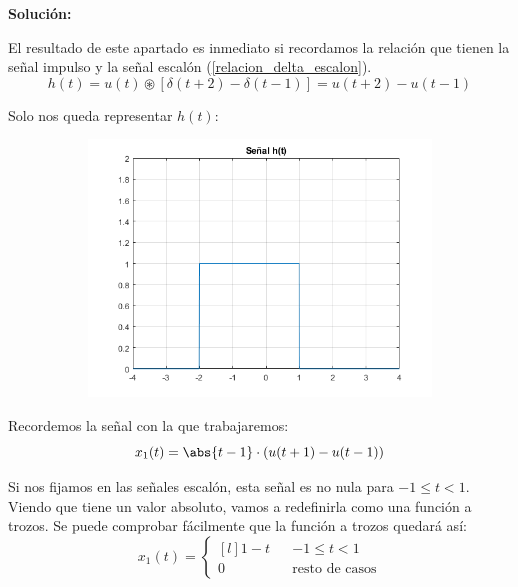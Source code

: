 \documentclass[a4paper]{book}
\begin{document}
\vspace{\parskip}
\textbf{Solución:}
\begin{myenumerate}
	\item El resultado de este apartado es inmediato si recordamos la relación que tienen la señal impulso y la señal escalón (\ref{relacion_delta_escalon}).
	\[h(t) = u(t) \circledast \left[ \delta (t+2) - \delta (t-1) \right] = \boxed{u(t+2) - u(t-1)}\]

	Solo nos queda representar $h(t)$:
	\begin{figure}[!ht]
		\caption{}
		\label{fig:Problema_1_a}
		\centering
		\begin{subfigure}[b]{0.7\linewidth}
			\includegraphics[width=\linewidth]{./Imágenes/aar.png}
		\end{subfigure}
	\end{figure}
	\item Recordemos la señal con la que trabajaremos: \[x_1(t) = \abs{t-1}\cdot \left( u(t+1) - u(t-1) \right)\]

	Si nos fijamos en las señales escalón, esta señal es no nula para $-1\leq t<1$. Viendo que tiene un valor absoluto, vamos a redefinirla como una función a trozos. Se puede comprobar fácilmente que la función a trozos quedará así:
	\[x_1(t) = \left\{ \begin{matrix*}[l]
			1-t	&& -1\leq t<1\\[5pt]
			0	&& \text{resto de casos}
		\end{matrix*} \right.\]


\end{myenumerate}
\end{document}
